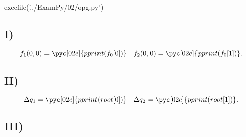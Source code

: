 \documentclass[../main.tex]{subfiles}
\begin{document}
\begin{pycode}[02e]
execfile('../ExamPy/02/opg.py')	
\end{pycode}

\subsection*{I)}%
\label{sub:i_}
\[
	f_1(0,0) = \pyc[02e]{pprint(f_0[0])}
	\quad
	f_2(0,0) = \pyc[02e]{pprint(f_0[1])}
.\] 
\subsection*{II)}%
\label{sub:ii_}


\[
	\Delta q_1 = \pyc[02e]{pprint(root[0])}
	\quad
	\Delta q_2 = \pyc[02e]{pprint(root[1])}
.\] 
\subsection*{III)}%
\label{sub:iii_}
\begin{center}
\end{center}


\inputminted{python}{../ExamPy/02/opg.py}


	
\end{document}
